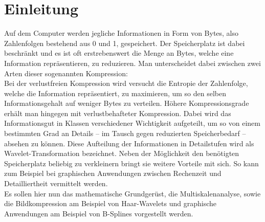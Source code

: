 \section{Einleitung}
%
Auf dem Computer werden jegliche Informationen in Form von Bytes, also Zahlenfolgen bestehend aus 0 und 1, gespeichert. Der Speicherplatz ist dabei beschränkt und es ist oft erstrebenswert die Menge an Bytes, welche eine Information repräsentieren, zu reduzieren. Man unterscheidet dabei zwischen zwei Arten dieser sogenannten Kompression:\\
Bei der verlustfreien Kompression wird versucht die Entropie der Zahlenfolge, welche die Information repräsentiert, zu maximieren, um so den selben Informationsgehalt auf weniger Bytes zu verteilen.
Höhere Kompressionsgrade erhält man hingegen mit verlustbehafteter Kompression. Dabei wird das Informationsgut in Klassen verschiedener Wichtigkeit aufgeteilt, um so von einem bestimmten Grad an Details -- im Tausch gegen reduzierten Speicherbedarf -- absehen zu können. Diese Aufteilung der Informationen in Detailstufen wird als Wavelet-Transformation bezeichnet. Neben der Möglichkeit den benötigten Speicherplatz beliebig zu verkleinern bringt sie weitere Vorteile mit sich. So kann zum Beispiel bei graphischen Anwendungen zwischen Rechenzeit und Detailliertheit vermittelt werden.\\
Es sollen hier nun das mathematische Grundgerüst, die Multiskalenanalyse, sowie die Bildkompression am Beispiel von Haar-Wavelets und graphische Anwendungen am Beispiel von B-Splines vorgestellt werden.